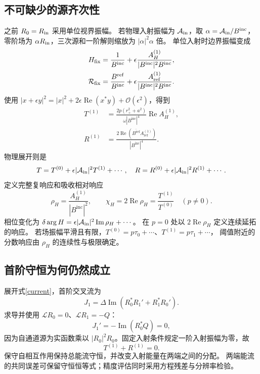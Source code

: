 \documentclass[UTF8,fontset=fandol,11pt,a4paper]{ctexart}
\newcommand{\Rea}{\operatorname{Re}}
\newcommand{\Ima}{\operatorname{Im}}
\newcommand{\Bin}{B^{\mathrm{inc}}}
\newcommand{\Bref}{B^{\mathrm{ref}}}
\newcommand{\AH}{A_H^{(1)}}
\newcommand{\Aref}{A_{\mathrm{ref}}^{(1)}}
\newcommand{\calO}{\mathcal O}
\numberwithin{equation}{section}
\begin{document}
\subsection{不可缺少的源齐次性}
之前 $R_0=R_{\rm in}$ 采用单位视界振幅。
若物理入射振幅为 $\mathcal A_{\rm in}$，取 $\alpha=\mathcal A_{\rm in}/\Bin$，
零阶场为 $\alpha R_{\rm in}$，三次源和一阶解则缩放为 $|\alpha|^2\alpha$ 倍。
单位入射时边界振幅变成
\begin{align}
H_{\rm fix}&=\frac1{\Bin}+\epsilon\frac{\AH}{|\Bin|^2\Bin},\\
\mathcal R_{\rm fix}&=\frac{\Bref}{\Bin}+\epsilon\frac{\Aref}{|\Bin|^2\Bin}.
\end{align}
使用 $|x+\epsilon y|^2=|x|^2+2\epsilon\Rea(x^*y)+\calO(\epsilon^2)$，得到
\begin{align}
T^{(1)}&=\frac{2p(r_+^2+a^2)}{\omega|\Bin|^4}\Rea\AH,\\
R^{(1)}&=\frac{2\Rea(\overline{\Bref}\Aref)}{|\Bin|^4}.
\end{align}
物理展开则是
\begin{equation}
T=T^{(0)}+\epsilon|\mathcal A_{\rm in}|^2T^{(1)}+\cdots,
\quad R=R^{(0)}+\epsilon|\mathcal A_{\rm in}|^2R^{(1)}+\cdots.
\end{equation}
定义完整复响应和吸收相对响应
\begin{equation}
\rho_H=\frac{\AH}{|\Bin|^2},\qquad
\chi_H=2\Rea\rho_H=\frac{T^{(1)}}{T^{(0)}}\quad(p\ne0).
\end{equation}
相位变化为 $\delta\arg H=\epsilon|\mathcal A_{\rm in}|^2\Ima\rho_H+\cdots$。
在 $p=0$ 处以 $2\Rea\rho_H$ 定义连续延拓的响应。
若场振幅平滑且有限，$T^{(0)}=p\tau_0+\cdots$、$T^{(1)}=p\tau_1+\cdots$，
阈值附近的分数响应由 $\rho_H$ 的连续性与极限确定。

\subsection{首阶守恒为何仍然成立}
展开式\eqref{current}，首阶交叉流为
\begin{equation}
J_1=\Delta\Ima(R_0^*R_1'+R_1^*R_0').
\end{equation}
求导并使用 $\mathcal LR_0=0$、$\mathcal LR_1=-Q$：
\begin{equation}J_1'=-\Ima(R_0^*Q)=0,\end{equation}
因为自通道源为实函数乘以 $|R_0|^2R_0$。固定入射条件规定一阶入射振幅为零，故
\begin{equation}\boxed{T^{(1)}+R^{(1)}=0.}\end{equation}
保守自相互作用保持总能流守恒，并改变入射能量在两端之间的分配。
两端能流的共同误差可保留守恒恒等式；精度评估同时采用方程残差与分辨率检验。
\end{document}
